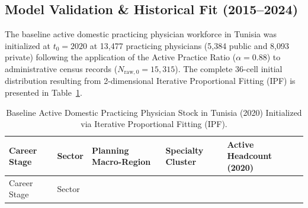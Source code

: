 \documentclass[
  11pt,
  a4paper]{article}
\begin{document}
\subsection{Model Validation \& Historical Fit
(2015--2024)}\label{sec-results-validation}

The baseline active domestic practicing physician workforce in Tunisia
was initialized at \(t_0 = 2020\) at 13,477 practicing physicians (5,384
public and 8,093 private) following the application of the Active
Practice Ratio (\(\alpha = 0.88\)) to administrative census records
(\(N_{\text{raw}, 0} = 15,315\)). The complete 36-cell initial
distribution resulting from 2-dimensional Iterative Proportional Fitting
(IPF) is presented in Table~\ref{tbl-baseline-stock}.

\begin{longtable}[]{@{}
  >{\raggedright\arraybackslash}p{}
  >{\raggedright\arraybackslash}p{}
  >{\raggedright\arraybackslash}p{}
  >{\raggedright\arraybackslash}p{}
  >{\centering\arraybackslash}p{}@{}}
\caption{Baseline Active Domestic Practicing Physician Stock in Tunisia
(2020) Initialized via Iterative Proportional Fitting
(IPF).}\label{tbl-baseline-stock}\tabularnewline
\toprule\noalign{}
\begin{minipage}[b]{\linewidth}\raggedright
Career Stage
\end{minipage} & \begin{minipage}[b]{\linewidth}\raggedright
Sector
\end{minipage} & \begin{minipage}[b]{\linewidth}\raggedright
Planning Macro-Region
\end{minipage} & \begin{minipage}[b]{\linewidth}\raggedright
Specialty Cluster
\end{minipage} & \begin{minipage}[b]{\linewidth}\centering
Active Headcount (2020)
\end{minipage} \\
\midrule\noalign{}
\endfirsthead
\toprule\noalign{}
\begin{minipage}[b]{\linewidth}\raggedright
Career Stage
\end{minipage} & \begin{minipage}[b]{\linewidth}\raggedright
Sector
\end{minipage} & \begin{minipage}[b]{\linewidth}\raggedright

\end{minipage}
\end{longtable}
\end{document}
